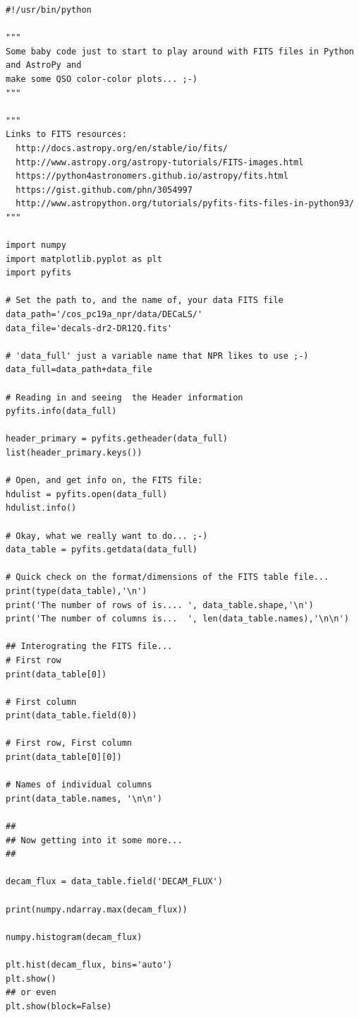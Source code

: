 \documentclass[11pt,a4paper]{article}
\begin{document}
\begin{lstlisting}
#!/usr/bin/python

"""
Some baby code just to start to play around with FITS files in Python and AstroPy and
make some QSO color-color plots... ;-)
"""

"""
Links to FITS resources:
  http://docs.astropy.org/en/stable/io/fits/
  http://www.astropy.org/astropy-tutorials/FITS-images.html
  https://python4astronomers.github.io/astropy/fits.html
  https://gist.github.com/phn/3054997
  http://www.astropython.org/tutorials/pyfits-fits-files-in-python93/
"""

import numpy
import matplotlib.pyplot as plt
import pyfits

# Set the path to, and the name of, your data FITS file 
data_path='/cos_pc19a_npr/data/DECaLS/'
data_file='decals-dr2-DR12Q.fits'

# 'data_full' just a variable name that NPR likes to use ;-)
data_full=data_path+data_file

# Reading in and seeing  the Header information
pyfits.info(data_full)

header_primary = pyfits.getheader(data_full)
list(header_primary.keys())

# Open, and get info on, the FITS file:
hdulist = pyfits.open(data_full)
hdulist.info()

# Okay, what we really want to do... ;-) 
data_table = pyfits.getdata(data_full)

# Quick check on the format/dimensions of the FITS table file...
print(type(data_table),'\n')
print('The number of rows of is.... ', data_table.shape,'\n')
print('The number of columns is...  ', len(data_table.names),'\n\n')

## Interograting the FITS file...
# First row
print(data_table[0])

# First column
print(data_table.field(0))

# First row, First column
print(data_table[0][0])

# Names of individual columns
print(data_table.names, '\n\n')

##
## Now getting into it some more...
##

decam_flux = data_table.field('DECAM_FLUX')

print(numpy.ndarray.max(decam_flux))

numpy.histogram(decam_flux)

plt.hist(decam_flux, bins='auto')
plt.show()
## or even
plt.show(block=False)
\end{lstlisting}
\end{document}
